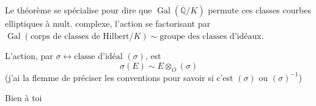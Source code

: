 Le théorème se spécialise pour dire que $\operatorname{Gal}(\overline{\mathbb{Q}}/K)$ permute ces classes  courbes elliptiques à mult. complexe, l'action se factorisant par $\operatorname{Gal}(\text{corps de classes de Hilbert}/K)\sim\text{groupe des classes d'idéaux}$.

L'action, par $\sigma\longleftrightarrow\text{classe d'idéal }(\sigma)$, est
\[
\sigma(E)\sim E\otimes_O(\sigma)
\]
(j'ai la flemme de préciser les conventions pour savoir si c'est $(\sigma)$ ou $(\sigma)^{-1}$)

\begin{center}
Bien à toi

\end{center}
